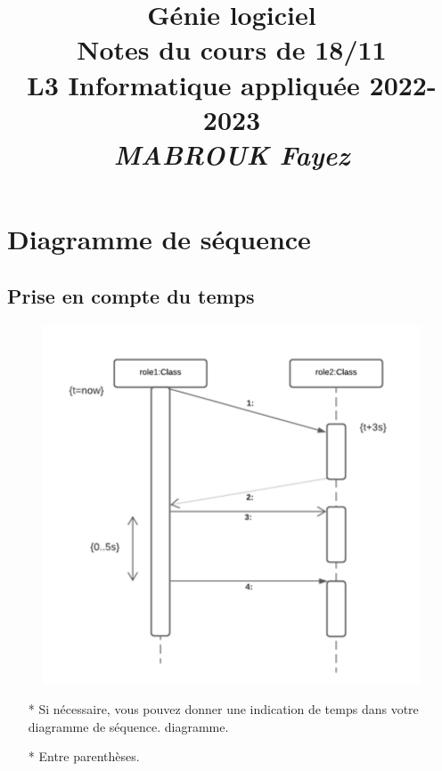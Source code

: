 \documentclass[12pt]{article}
\title{{\bf  Génie logiciel} \\
	Notes du cours de 18/11  \\
	{\small L3 Informatique appliquée 2022-2023} \\
	{\it \small MABROUK Fayez}}
\begin{document}
	\maketitle
	\newpage
	\section{Diagramme de séquence}
	\subsection{Prise en compte du temps}
		\begin{figure}[!hbtp]
		\centering
		\includegraphics[scale=0.75]{Capture1.PNG}
	\end{figure}
	\begin{itemize}
		\item[* ] Si nécessaire, vous pouvez donner une indication de temps
		dans votre diagramme de séquence.
		diagramme.
		\item[* ] Entre parenthèses.
	\end{itemize}
\end{document}

